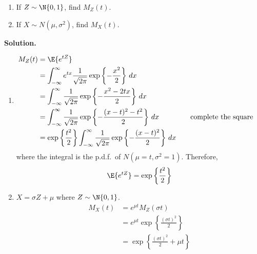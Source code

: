 \begin{Example}{}{}
    \begin{enumerate}[label=(\roman*)]
        \item If $ Z \sim \N{0,1} $, find $ M_Z(t) $.
        \item If $ X \sim N(\mu,\sigma^2) $, find $ M_X(t) $.
    \end{enumerate}
    \textbf{Solution.}
    \begin{enumerate}[label=(\roman*)]
        \item \begin{align*}
                  M_Z(t)
                                                                     & =\E{e^{tZ}}                                                                        \\
                                                                     & =\int_{-\infty}^{\infty} e^{tx} \frac{1}{\sqrt{2\pi}}
                  \exp\left\{ -\frac{x^2}{2} \right\} \, d{x}                                                                                             \\
                                                                     & =\int_{-\infty}^{\infty} \frac{1}{\sqrt{2\pi}}
                  \exp\left\{ -\frac{x^2-2tx}{2} \right\} \, d{x}                                                                                         \\
                                                                     & =\int_{-\infty}^{\infty} \frac{1}{\sqrt{2\pi}}
                  \exp\left\{ -\frac{(x-t)^2-t^2}{2}\right\} \, d{x} & \quad                                                 & \text{complete the square} \\
                                                                     & =\exp\left\{ \frac{t^2}{2}\right\}
                  \int_{-\infty}^{\infty} \frac{1}{\sqrt{2\pi}}
                  \exp\left\{ -\frac{(x-t)^2}{2} \right\} \, d{x}
              \end{align*}
              where the integral is the p.d.f.\ of $ N(\mu=t,\sigma^2=1) $. Therefore,
              \[ \E{e^{tZ}}=\exp\left\{ \frac{t^2}{2}\right\} \]

        \item $ X=\sigma Z+\mu $ where $ Z \sim \N{0,1} $.
              \begin{align*}
                  M_X(t)
                   & =e^{\mu t}M_Z(\sigma t)                                            \\
                   & =e^{\mu t}\exp\left\{ \frac{\left( \sigma t \right)^2}{2} \right\} \\
                   & =\exp\left\{ \frac{(\sigma t)^2}{2} +\mu t\right\}
              \end{align*}
    \end{enumerate}
\end{Example}

